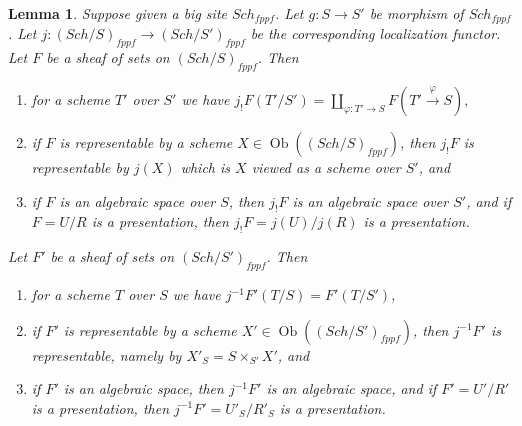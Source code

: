 \documentclass{stacks-project}
\theoremstyle{plain}
\newtheorem{lemma}[subsection]{Lemma}
\theoremstyle{definition}
\theoremstyle{remark}
\numberwithin{equation}{subsection}
\def\Sch{\mathit{Sch}}
\def\Ob{\mathop{\mathrm{Ob}}\nolimits}
\begin{document}
\begin{lemma}
\label{lemma-change-base-scheme}
Suppose given a big site $\Sch_{fppf}$.
Let $g : S \to S'$ be morphism of $\Sch_{fppf}$.
Let $j : (\Sch/S)_{fppf} \to (\Sch/S')_{fppf}$ be
the corresponding localization functor.
Let $F$ be a sheaf of sets on $(\Sch/S)_{fppf}$.
Then
\begin{enumerate}
\item for a scheme $T'$ over $S'$ we have
$j_!F(T'/S') =
\coprod\nolimits_{\varphi : T' \to S} F(T' \xrightarrow{\varphi} S),$
\item if $F$ is representable by a scheme
$X \in \Ob((\Sch/S)_{fppf})$,
then $j_!F$ is representable by $j(X)$ which is
$X$ viewed as a scheme over $S'$, and
\item if $F$ is an algebraic space over $S$, then $j_!F$ is an algebraic
space over $S'$, and if $F = U/R$ is a presentation, then
$j_!F = j(U)/j(R)$ is a presentation.
\end{enumerate}
Let $F'$ be a sheaf of sets on $(\Sch/S')_{fppf}$. Then
\begin{enumerate}
\item[(4)] for a scheme $T$ over $S$ we have $j^{-1}F'(T/S) = F'(T/S')$,
\item[(5)] if $F'$ is representable by a scheme
$X' \in \Ob((\Sch/S')_{fppf})$, then
$j^{-1}F'$ is representable, namely by $X'_S = S \times_{S'} X'$, and
\item[(6)] if $F'$ is an algebraic space, then
$j^{-1}F'$ is an algebraic space, and if $F' = U'/R'$ is a presentation,
then $j^{-1}F' = U'_S/R'_S$ is a presentation.
\end{enumerate}
\end{lemma}
\end{document}
